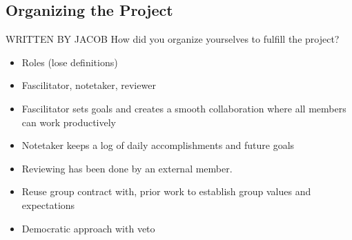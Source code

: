 \subsection{Organizing the Project}
WRITTEN BY JACOB
How did you organize yourselves to fulfill the project?

\begin{itemize}
	\item Roles (lose definitions)
	\item Fascilitator, notetaker, reviewer
	\item Fascilitator sets goals and creates a smooth collaboration where all members can work productively
	\item Notetaker keeps a log of daily accomplishments and future goals 
	\item Reviewing has been done by an external member. 
	\item Reuse group contract with, prior work to establish group values and expectations 
	\item Democratic approach with veto 
\end{itemize}

